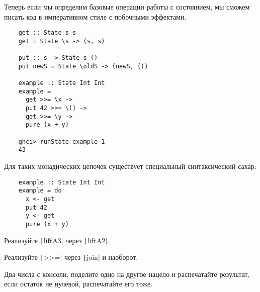 Теперь если мы определим базовые операции работы с состоянием, мы сможем писать код в императивном стиле с побочными эффектами.
\begin{verbatim}
    get :: State s s
    get = State \s -> (s, s)

    put :: s -> State s ()
    put newS = State \oldS -> (newS, ())

    example :: State Int Int
    example =
      get >>= \x ->
      put 42 >>= \() ->
      get >>= \y ->
      pure (x + y)

    ghci> runState example 1
    43
\end{verbatim}

Для таких монадических цепочек существует специальный синтаксический сахар:
\begin{verbatim}
    example :: State Int Int
    example = do
      x <- get
      put 42
      y <- get
      pure (x + y)
\end{verbatim}

\begin{task}
    Реализуйте \texttt|liftA3| через \texttt|liftA2|.
\end{task}

\begin{task}
    Реализуйте \texttt|>>=| через \texttt|join| и наоборот.
\end{task}

\begin{task}
    Два числа с консоли, поделите одно на другое нацело и распечатайте результат, если остаток не нулевой, распечатайте его тоже.
\end{task}
